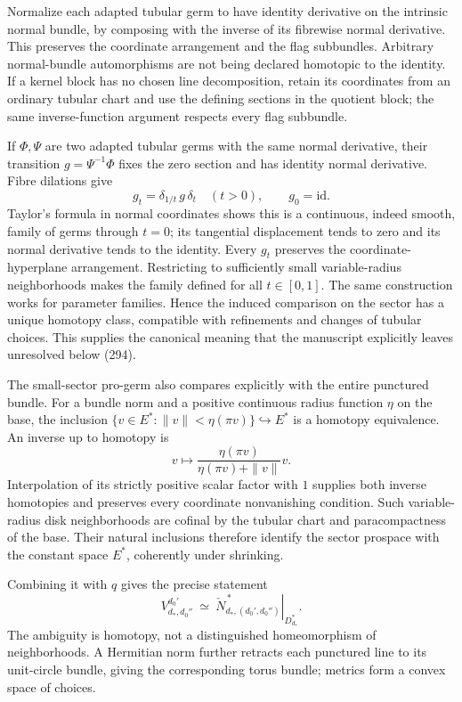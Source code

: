 Normalize each adapted tubular germ to have identity derivative on the intrinsic normal bundle, by composing with the inverse of its fibrewise normal derivative. This preserves the coordinate arrangement and the flag subbundles. Arbitrary normal-bundle automorphisms are not being declared homotopic to the identity. If a kernel block has no chosen line decomposition, retain its coordinates from an ordinary tubular chart and use the defining sections in the quotient block; the same inverse-function argument respects every flag subbundle.

If \(\Phi,\Psi\) are two adapted tubular germs with the same normal derivative, their transition \(g=\Psi^{-1}\Phi\) fixes the zero section and has identity normal derivative. Fibre dilations give \[
 g_t=\delta_{1/t}\,g\,\delta_t\quad(t>0),\qquad g_0=\mathrm{id}.
\] Taylor's formula in normal coordinates shows this is a continuous, indeed smooth, family of germs through \(t=0\); its tangential displacement tends to zero and its normal derivative tends to the identity. Every \(g_t\) preserves the coordinate-hyperplane arrangement. Restricting to sufficiently small variable-radius neighborhoods makes the family defined for all \(t\in[0,1]\). The same construction works for parameter families. Hence the induced comparison on the sector has a unique homotopy class, compatible with refinements and changes of tubular choices. This supplies the canonical meaning that the manuscript explicitly leaves unresolved below (294).

The small-sector pro-germ also compares explicitly with the entire punctured bundle. For a bundle norm and a positive continuous radius function \(\eta\) on the base, the inclusion \(\{v\in E^*:\|v\|<\eta(\pi v)\}\hookrightarrow E^*\) is a homotopy equivalence. An inverse up to homotopy is \[
 v\longmapsto \frac{\eta(\pi v)}{\eta(\pi v)+\|v\|}v.
\] Interpolation of its strictly positive scalar factor with \(1\) supplies both inverse homotopies and preserves every coordinate nonvanishing condition. Such variable-radius disk neighborhoods are cofinal by the tubular chart and paracompactness of the base. Their natural inclusions therefore identify the sector prospace with the constant space \(E^*\), coherently under shrinking.

Combining it with \(q\) gives the precise statement \[
 V^{d_0'}_{d_*,d_0''}
 \ \simeq\
 \left.\check N_{d_*,(d_0',d_0'')}^{\,*}\right|_{D_{d_*}^*}.
\] The ambiguity is homotopy, not a distinguished homeomorphism of neighborhoods. A Hermitian norm further retracts each punctured line to its unit-circle bundle, giving the corresponding torus bundle; metrics form a convex space of choices.

